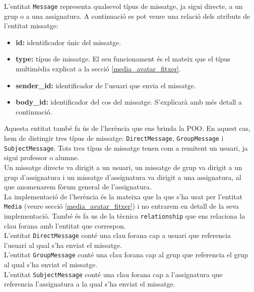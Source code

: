     L'entitat \texttt{Message} representa qualsevol típus de missatge, ja sigui directe, a un grup o a una assignatura. A continuació es pot veure una relació dels atributs de l'entitat missatge:
    
    \begin{itemize}
    	\item \textbf{id:} identificador únic del missatge.
    	\item \textbf{type:} típus de missatge. El seu funcionament és el mateix que el típus multimèdia explicat a la secció \ref{media_avatar_fitxer}.
    	\item \textbf{sender\_id:} identificador de l'usuari que envia el missatge. 
    	\item \textbf{body\_id:} identificador del cos del missatge. S'explicarà amb més detall a continuació.
    \end{itemize}
    
     Aquesta entitat també fa ús de l'herència que ens brinda la \ac{POO}. En aquest cas, hem de distingir tres típus de missatge: \texttt{DirectMessage}, \texttt{GroupMessage} i \texttt{SubjectMessage}. Tots tres típus de missatge tenen com a remitent un usuari, ja sigui professor o alumne. \\
     
     Un missatge directe va dirigit a un usuari, un missatge de grup va dirigit a un grup d'assignatura i un missatge d'assignatura va dirigit a una assignatura, al que anomenarem fòrum general de l'assignatura. \\
    
   	La implementació de l'herència és la mateixa que la que s'ha usat per l'entitat \texttt{Media} (veure secció \ref{media_avatar_fitxer}) i no entrarem en detall de la seva implementació. També és fa us de la tècnica \texttt{relationship} que ens relaciona la clau forana amb l'entitat que correspon. \\
   	
   	L'entitat \texttt{DirectMessage} conté una clau forana cap a usuari que referencia l'usuari al qual s'ha enviat el missatge. \\
   	
   	L'entitat \texttt{GroupMessage} conté una clau forana cap al grup que referencia el grup al qual s'ha enviat el missatge.\\
   	
   	 L'entitat \texttt{SubjectMessage} conté una clau forana cap a l'assignatura que referencia l'assignatura a la qual s'ha enviat el missatge.\\
   
